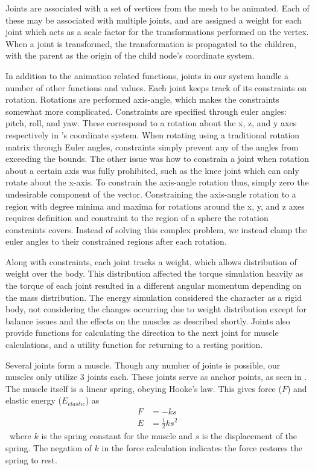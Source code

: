 Joints are associated with a set of vertices from the mesh to be animated.  Each of these may be associated with multiple joints, and are assigned a weight for each joint which acts as a scale factor for the transformations performed on the vertex.  When a joint is transformed, the transformation is propagated to the children, with the parent as the origin of the child node's coordinate system.

In addition to the animation related functions, joints in our system handle a number of other functions and values.  Each joint keeps track of its constraints on rotation.  Rotations are performed axis-angle, which makes the constraints somewhat more complicated.  Constraints are specified through euler angles: pitch, roll, and yaw.  These correspond to a rotation about the x, z, and y axes respectively in \unity{}'s coordinate system.  When rotating using a traditional rotation matrix through Euler angles, constraints simply prevent any of the angles from exceeding the bounds.  The other issue was how to constrain a joint when rotation about a certain axis was fully prohibited, such as the knee joint which can only rotate about the x-axis.  To constrain the axis-angle rotation thus, simply zero the undesirable component of the vector.  Constraining the axis-angle rotation to a region with degree minima and maxima for rotations around the x, y, and z axes requires definition and constraint to the region of a sphere the rotation constraints covers.  Instead of solving this complex problem, we instead clamp the euler angles to their constrained regions after each rotation.

Along with constraints, each joint tracks a weight, which allows distribution of weight over the body.  This distribution affected the torque simulation heavily as the torque of each joint resulted in a different angular momentum depending on the mass distribution.  The energy simulation considered the character as a rigid body, not considering the changes occurring due to weight distribution except for balance issues and the effects on the muscles as described shortly.  Joints also provide functions for calculating the direction to the next joint for muscle calculations, and a utility function for returning to a resting position.

Several joints form a muscle.  Though any number of joints is possible, our muscles only utilize 3 joints each.  These joints serve as anchor points, as seen in \cite{muscle_based_bipeds}.  The muscle itself is a linear spring, obeying Hooke's law.  This gives force ($F$) and elastic energy ($E_{elastic}$) as
\begin{align*}
	F &= -ks \\
	E &= \frac{1}{2} k s^2
\end{align*}\
where $k$ is the spring constant for the muscle and $s$ is the displacement of the spring.  The negation of $k$ in the force calculation indicates the force restores the spring to rest.

